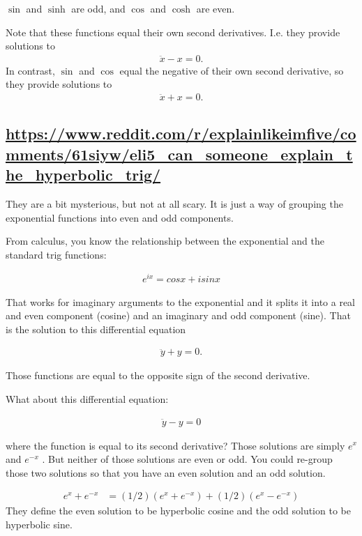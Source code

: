 $\sin$ and $\sinh$ are odd, and $\cos$ and $\cosh$ are even.

Note that these functions equal their own second derivatives. I.e. they provide solutions to
\begin{align*}
  \ddot{x} - x = 0.
\end{align*}
In contrast, $\sin$ and $\cos$ equal the negative of their own second derivative, so they provide
solutions to
\begin{align*}
  \ddot{x} + x = 0.
\end{align*}

\subsection*{\url{https://www.reddit.com/r/explainlikeimfive/comments/61siyw/eli5_can_someone_explain_the_hyperbolic_trig/}}

They are a bit mysterious, but not at all scary. It is just a way of grouping the exponential
functions into even and odd components.

From calculus, you know the relationship between the exponential and the standard trig functions:

\begin{align*}
e^{ix} = cos x + i sin x
\end{align*}

That works for imaginary arguments to the exponential and it splits it into a real and even
component (cosine) and an imaginary and odd component (sine). That is the solution to this
differential equation

\begin{align*}
  \ddot{y} + y = 0.
\end{align*}

Those functions are equal to the opposite sign of the second
derivative.

What about this differential equation:

\begin{align*}
  \ddot{y} - y = 0
\end{align*}

where the function is equal to its second derivative? Those solutions are simply $e^x$ and $e^{-x}$
. But neither of those solutions are even or odd. You could re-group those two solutions so that you
have an even solution and an odd solution.

\begin{align*}
e^x + e^{-x} &= (1/2) (e^x + e^{-x} ) + (1/2) (e^x - e^{-x} )
\end{align*}
They define the even solution to be hyperbolic cosine and the odd solution to be hyperbolic sine.

